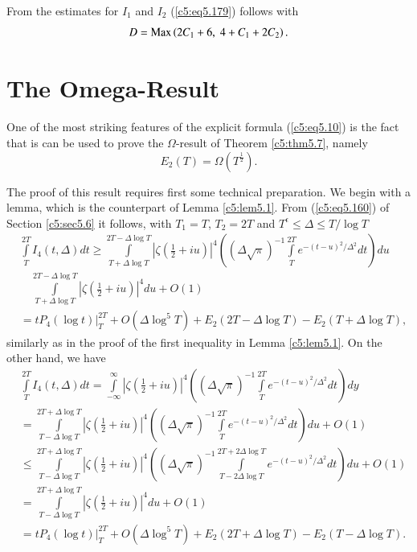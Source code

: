 From the estimates for $I_1$ and $I_2$ (\ref{c5:eq5.179}) follows with  
$$
D = \operatorname{Max} \left(2C_1 + 6, \; 4 + C_1 + 2C_2\right).
$$

\section{The Omega-Result}\label{c5:sec5.7}

One of the most striking features of the explicit formula
(\ref{c5:eq5.10}) is the fact that is can be used to prove the
$\Omega$-result of Theorem \ref{c5:thm5.7}, namely 
$$
E_2 (T) = \Omega (T^{\frac{1}{2}}).
$$

The proof of this result requires first some technical preparation. We
begin with a lemma, which is the counterpart of Lemma
\ref{c5:lem5.1}. From (\ref{c5:eq5.160}) of Section \ref{c5:sec5.6} it
follows, with $T_1  = T$, $T_2 = 2T$ and $T^{\epsilon} \leq \Delta
\leq T/\log T$ 
\begin{align*}
& \int\limits^{2T}_T I_4 (t,\Delta) dt  \geq \int\limits^{2T - \Delta
    \log T}_{T + \Delta \log T} \left|\zeta \left(\frac{1}{2} + iu
  \right)\right|^4 \left((\Delta \sqrt{\pi})^{-1} \int\limits^{2T}_T
  e^{-(t-u)^2/\Delta^2} dt \right) du\\ 
&\quad \int\limits^{2T - \Delta \log T}_{T + \Delta \log T} \left|\zeta
  \left(\frac{1}{2} + iu \right)\right|^4 du + O (1)\\ 
& = t P_4 (\log t) \Big|^{2T}_T  + O (\Delta \log^5 T) + E_2 (2T -
  \Delta \log T) - E_2 (T + \Delta \log T), 
 \end{align*}\pageoriginale
similarly as in the proof of the first inequality in Lemma
\ref{c5:lem5.1}. On the other hand, we have 
\begin{align*}
& \int\limits^{2T}_T I_4 (t,\Delta) dt = \int\limits^\infty_{-\infty}
  \left|\zeta \left(\frac{1}{2} + iu \right)\right|^4 \left((\Delta
  \sqrt{\pi})^{-1} \int\limits^{2T}_T e^{-(t-u)^2/\Delta^2} dt \right)
  dy\\ 
& = \int\limits^{2T+\Delta \log T}_{T - \Delta \log T} \left|\zeta
  \left(\frac{1}{2} + iu \right)\right|^4 \left( (\Delta
  \sqrt{\pi})^{-1} 
  \int\limits^{2T}_T e^{-(t-u)^2/\Delta^2} dt\right) du + O (1)\\ 
& \leq \int\limits^{2T + \Delta \log T}_{T -\Delta \log T} \left|\zeta
  \left(\frac{1}{2} + iu \right)\right|^4 \left( (\Delta \sqrt{\pi})^{-1}
  \int\limits^{2T + 2 \Delta \log T}_{T - 2 \Delta \log T}
  e^{-(t-u)^2/\Delta^2} dt \right) du + O(1)\\ 
& = \int\limits^{2T + \Delta \log T}_{T - \Delta \log T} \left|\zeta
  \left(\frac{1}{2} + iu \right)\right|^4  du + O (1)\\ 
& = t P_4 (\log t) \Big|^{2T}_T + O \left(\Delta \log^5 T\right) + E_2
  (2T + 
  \Delta \log T) - E_2 (T - \Delta \log T). 
\end{align*}

